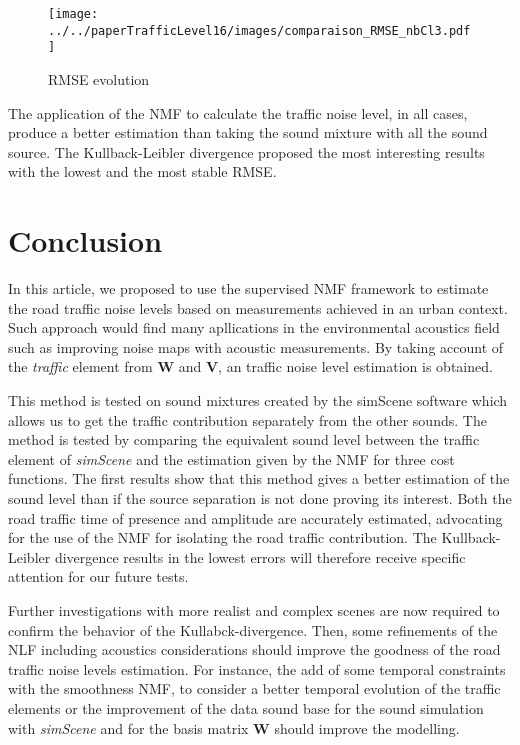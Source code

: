 \documentclass{article}
\begin{document}
\begin{sloppy}
\begin{figure}[t]
\centering
\centerline{\texttt{[image: ../../paperTrafficLevel16/images/comparaison\_RMSE\_nbCl3.pdf]}}
\caption{RMSE evolution}
\label{fig:rmse}
\end{figure}

The application of the NMF to calculate the traffic noise level, in all cases, produce a better estimation than taking the sound mixture with all the sound source. The Kullback-Leibler divergence proposed the most interesting results with the lowest and the most stable RMSE.


\section{Conclusion}

In this article, we proposed to use the supervised NMF framework to estimate the road traffic noise levels based on measurements achieved in an urban context. Such approach would find many apllications in the environmental acoustics field such as improving noise maps with acoustic measurements. By taking account of the \textit{traffic} element from $\mathbf{W}$ and $\mathbf{V}$, an traffic noise level estimation is obtained.

This method is tested on sound mixtures created by the simScene software which allows us to get the traffic contribution separately from the other sounds. The method is tested by comparing the equivalent sound level between the traffic element of \textit{simScene} and the estimation given by the NMF for three cost functions. The first results show that this method gives a better estimation of the sound level than if the source separation is not done proving its interest. Both the road traffic time of presence and amplitude are accurately estimated, advocating for the use of the NMF for isolating the road traffic contribution. The Kullback-Leibler divergence results in the lowest errors will therefore receive specific attention for our future tests. 

Further investigations with more realist and complex scenes are now required to confirm the behavior of the Kullabck-divergence. Then, some refinements of the NLF including acoustics considerations should improve the goodness of the road traffic noise levels estimation. For instance, the add of some temporal constraints with the smoothness NMF, to consider a better temporal evolution of the traffic elements or the improvement of the data sound base for the sound simulation with \textit{simScene} and for the basis matrix $\mathbf{W}$ should improve the modelling.


\end{sloppy}
\end{document}
